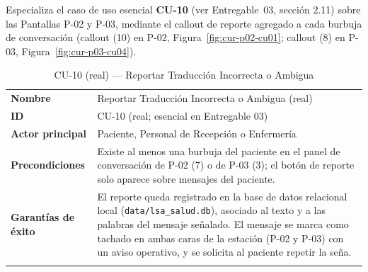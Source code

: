 Especializa el caso de uso esencial \textbf{CU-10} (ver Entregable~03,
sección 2.11) sobre las Pantallas P-02 y P-03, mediante el callout de
reporte agregado a cada burbuja de conversación (callout (10) en P-02,
Figura~\ref{fig:cur-p02-cu01}; callout (8) en P-03,
Figura~\ref{fig:cur-p03-cu04}).

\begin{longtable}{@{}p{4.1cm} >{\raggedright\arraybackslash}p{11.2cm}@{}}
\toprule
\textbf{Nombre} & Reportar Traducción Incorrecta o Ambigua (real) \\
\textbf{ID} & CU-10 (real; esencial en Entregable 03) \\
\textbf{Actor principal} & Paciente, Personal de Recepción o Enfermería \\
\textbf{Precondiciones} &
Existe al menos una burbuja del paciente en el panel de conversación de
P-02 (7) o de P-03 (3); el botón de reporte solo aparece sobre mensajes
del paciente. \\
\textbf{Garantías de éxito} &
El reporte queda registrado en la base de datos relacional local
(\texttt{data/lsa\_salud.db}), asociado al texto y a las palabras del
mensaje señalado. El mensaje se marca como tachado en ambas caras de la
estación (P-02 y P-03) con un aviso operativo, y se solicita al paciente
repetir la seña. \\
\bottomrule
\caption{CU-10 (real) — Reportar Traducción Incorrecta o Ambigua}
\end{longtable}

